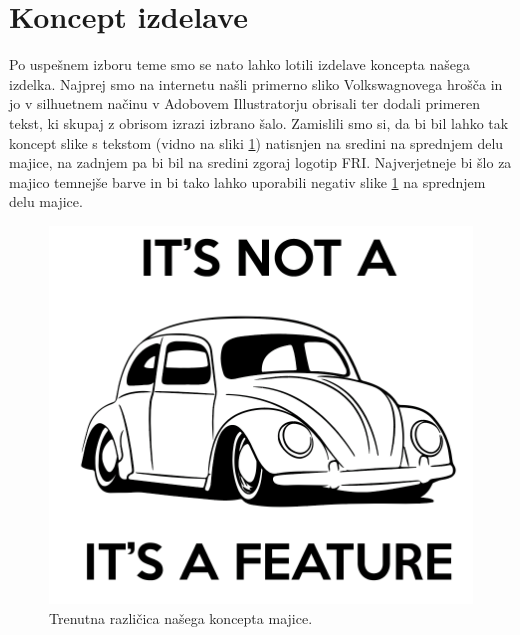 \documentclass[11pt,a4paper]{article}
\begin{document}
\section{Koncept izdelave}
Po uspešnem izboru teme smo se nato lahko lotili izdelave koncepta našega izdelka. Najprej smo na internetu našli primerno sliko Volkswagnovega hrošča in jo v silhuetnem načinu v Adobovem Illustratorju obrisali ter dodali primeren tekst, ki skupaj z obrisom izrazi izbrano šalo. Zamislili smo si, da bi bil lahko tak koncept slike s tekstom (vidno na sliki \ref{sl:koncept}) natisnjen na sredini na sprednjem delu majice, na zadnjem pa bi bil na sredini zgoraj logotip FRI. Najverjetneje bi šlo za majico temnejše barve in bi tako lahko uporabili negativ slike \ref{sl:koncept} na sprednjem delu majice.

\begin{figure}[htb]
\centerline{\includegraphics[width=1.0\textwidth, scale = 0.5]{koncept.png}}
\caption{Trenutna različica našega koncepta majice.}
\label{sl:koncept}
\end{figure}




\end{document}
